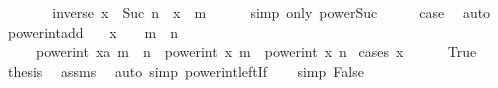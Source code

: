 \begin{isabellebody}
\ \ \isamarkupfalse%
\ \isamarkupfalse%
\ {\isachardoublequoteopen}{\isasymdots}\ {\isacharequal}{\kern0pt}\ inverse\ x\ {\isacharcircum}{\kern0pt}\ {\isacharparenleft}{\kern0pt}Suc\ n{\isacharparenright}{\kern0pt}\ {\isacharasterisk}{\kern0pt}\ x\ {\isacharcircum}{\kern0pt}\ m{\isachardoublequoteclose}\isanewline
\ \ \ \ \isamarkupfalse%
\ {\isacharparenleft}{\kern0pt}simp\ only{\isacharcolon}{\kern0pt}\ power{\isacharunderscore}{\kern0pt}Suc{}{\isacharparenright}{\kern0pt}\isanewline
\ \ \isamarkupfalse%
\ \isamarkupfalse%
\ {\isacharquery}{\kern0pt}case\ \isacommand{{\isachardot}{\kern0pt}}\isamarkupfalse%
\isanewline
{}\isamarkupfalse%
\ auto%
\endisatagproof
{\isafoldproof}%
%
\isadelimproof
\isanewline
%
\endisadelimproof
\isanewline
{}\isamarkupfalse%
\ power{\isacharunderscore}{\kern0pt}int{\isacharunderscore}{\kern0pt}add{\isacharcolon}{\kern0pt}\isanewline
\ \ \ {\isachardoublequoteopen}x\ {\isasymnoteq}\ {}\ {\isasymor}\ m\ {\isacharplus}{\kern0pt}\ n\ {\isasymnoteq}\ {}{\isachardoublequoteclose}\isanewline
\ \ \ \ \ {\isachardoublequoteopen}power{\isacharunderscore}{\kern0pt}int\ {\isacharparenleft}{\kern0pt}x{\isacharcolon}{\kern0pt}{\isacharcolon}{\kern0pt}{\isacharprime}{\kern0pt}a{\isacharparenright}{\kern0pt}\ {\isacharparenleft}{\kern0pt}m\ {\isacharplus}{\kern0pt}\ n{\isacharparenright}{\kern0pt}\ {\isacharequal}{\kern0pt}\ power{\isacharunderscore}{\kern0pt}int\ x\ m\ {\isacharasterisk}{\kern0pt}\ power{\isacharunderscore}{\kern0pt}int\ x\ n{\isachardoublequoteclose}\isanewline
%
\isadelimproof
%
\endisadelimproof
%
\isatagproof
{}\isamarkupfalse%
\ {\isacharparenleft}{\kern0pt}cases\ {\isachardoublequoteopen}x\ {\isacharequal}{\kern0pt}\ {}{\isachardoublequoteclose}{\isacharparenright}{\kern0pt}\isanewline
\ \ \isamarkupfalse%
\ True\isanewline
\ \ \isamarkupfalse%
\ {\isacharquery}{\kern0pt}thesis\ \isamarkupfalse%
\ assms\ \isamarkupfalse%
\ {\isacharparenleft}{\kern0pt}auto\ simp{\isacharcolon}{\kern0pt}\ power{\isacharunderscore}{\kern0pt}int{\isacharunderscore}{\kern0pt}{}{\isacharunderscore}{\kern0pt}left{\isacharunderscore}{\kern0pt}If{\isacharparenright}{\kern0pt}\isanewline
{}\isamarkupfalse%
\isanewline
\ \ \isamarkupfalse%
\ {\isacharbrackleft}{\kern0pt}simp{\isacharbrackright}{\kern0pt}{\isacharcolon}{\kern0pt}\ False\isanewline

\end{isabellebody}
